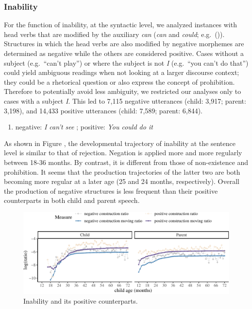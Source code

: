 \documentclass[
  english,
  man,floatsintext]{apa6}
\providecommand{\tightlist}{%
  \setlength{\itemsep}{0pt}\setlength{\parskip}{0pt}}
\begin{document}
\hypertarget{inability}{%
\subsubsection{Inability}\label{inability}}

For the function of inability, at the syntactic level, we analyzed instances with head verbs that are modified by the auxiliary \emph{can} (\emph{can} and \emph{could}; e.g.~()). Structures in which the head verbs are also modified by negative morphemes are determined as negative while the others are considered positive. Cases without a subject (e.g.~``can't play'') or where the subject is not \emph{I} (e.g.~``you can't do that'') could yield ambiguous readings when not looking at a larger discourse context; they could be a rhetorical question or also express the concept of prohibition. Therefore to potentially avoid less ambiguity, we restricted our analyses only to cases with a subject \emph{I}. This led to 7,115 negative utterances (child: 3,917; parent: 3,198), and 14,433 positive utterances (child: 7,589; parent: 6,844).

\begin{enumerate}
\def\labelenumi{(\arabic{enumi})}
\setcounter{enumi}{7}
\tightlist
\item
  negative: \emph{I can't see} ; positive: \emph{You could do it}
\end{enumerate}

As shown in Figure , the developmental trajectory of inability at the sentence level is similar to that of rejection. Negation is applied more and more regularly between 18-36 months. By contrast, it is different from those of non-existence and prohibition. It seems that the production trajectories of the latter two are both becoming more regular at a later age (25 and 24 months, respectively). Overall the production of negative structures is less frequent than their positive counterparts in both child and parent speech.

\begin{figure}[H]

{\centering \includegraphics{neg_construction_article_files/figure-latex/inability-1} 

}

\caption{Inability and its positive counterparts.}\label{fig:inability}
\end{figure}
\end{document}
